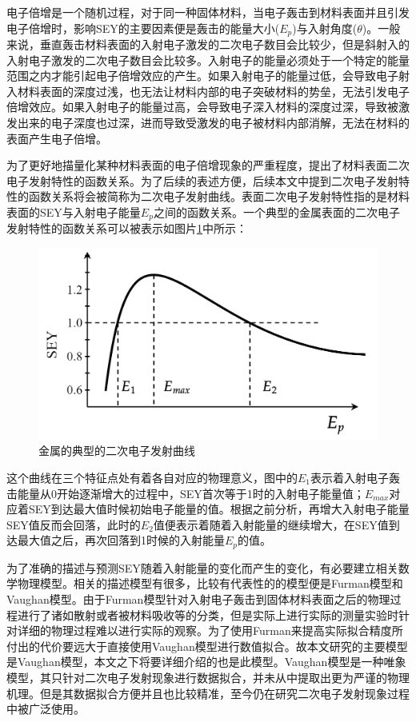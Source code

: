\documentclass[master]{thesis-uestc}
\begin{document}
电子倍增是一个随机过程，对于同一种固体材料，当电子轰击到材料表面并且引发电子倍增时，影响SEY的主要因素便是轰击的能量大小($E_p$)与入射角度($\theta$)。一般来说，垂直轰击材料表面的入射电子激发的二次电子数目会比较少，但是斜射入的入射电子激发的二次电子数目会比较多。入射电子的能量必须处于一个特定的能量范围之内才能引起电子倍增效应的产生。如果入射电子的能量过低，会导致电子射入材料表面的深度过浅，也无法让材料内部的电子突破材料的势垒，无法引发电子倍增效应。如果入射电子的能量过高，会导致电子深入材料的深度过深，导致被激发出来的电子深度也过深，进而导致受激发的电子被材料内部消解，无法在材料的表面产生电子倍增。

为了更好地描量化某种材料表面的电子倍增现象的严重程度，提出了材料表面二次电子发射特性的函数关系。为了后续的表述方便，后续本文中提到二次电子发射特性的函数关系将会被简称为二次电子发射曲线。表面二次电子发射特性指的是材料表面的SEY与入射电子能量$E_p$之间的函数关系。一个典型的金属表面的二次电子发射特性的函数关系可以被表示如图片\ref{fig:SEY_EP}中所示：
\begin{figure}[!htb]
    \centering
    \includegraphics[width=\textwidth]{pic/chapter2/二次电子发射曲线.png}
    \caption{金属的典型的二次电子发射曲线}
    \label{fig:SEY_EP}
\end{figure}

这个曲线在三个特征点处有着各自对应的物理意义，图中的$E_1$表示着入射电子轰击能量从0开始逐渐增大的过程中，SEY首次等于1时的入射电子能量值；$E_{max}$对应着SEY到达最大值时候初始电子能量的值。根据之前分析，再增大入射电子能量SEY值反而会回落，此时的$E_2$值便表示着随着入射能量的继续增大，在SEY值到达最大值之后，再次回落到1时候的入射能量$E_p$的值。

为了准确的描述与预测SEY随着入射能量的变化而产生的变化，有必要建立相关数学物理模型。相关的描述模型有很多，比较有代表性的的模型便是Furman模型和Vaughan模型。由于Furman模型针对入射电子轰击到固体材料表面之后的物理过程进行了诸如散射或者被材料吸收等的分类，但是实际上进行实际的测量实验时针对详细的物理过程难以进行实际的观察。为了使用Furman来提高实际拟合精度所付出的代价要远大于直接使用Vaughan模型进行数值拟合。故本文研究的主要模型是Vaughan模型，本文之下将要详细介绍的也是此模型。Vaughan模型是一种唯象模型，其只针对二次电子发射现象进行数据拟合，并未从中提取出更为严谨的物理机理。但是其数据拟合方便并且也比较精准，至今仍在研究二次电子发射现象过程中被广泛使用。
\end{document}
